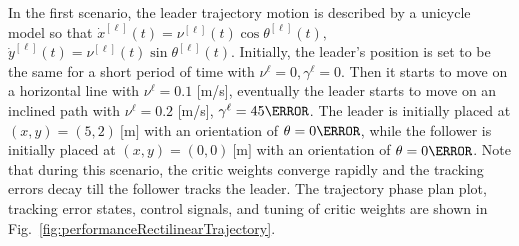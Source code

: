 \documentclass[letterpaper]{article} %
\begin{document}
In the first scenario, the leader trajectory motion is described by a unicycle model so that %
%
$\dot x^{[\ell]}(t) = \nu^{[\ell]}(t)\cos\theta^{[\ell]}(t),$ %
$\dot y^{[\ell]}(t) = \nu^{[\ell]}(t)\sin\theta^{[\ell]}(t).$
%
Initially, the leader's position is set to be the same for a short period of time with $\nu^{\ell} = 0 , \gamma^{\ell} = 0$. Then it starts to move on a horizontal line with $\nu^{\ell} = 0.1 $ [m/s], eventually the leader starts to move on an inclined path with $\nu^{\ell} = 0.2$ [m/s], $\gamma^{\ell} = 45\degree$. The leader is initially placed at $(x,y) = (5, 2)~\si{[\meter]}$ with an orientation of $\theta = 0 \degree $, while the follower  is initially placed at $(x,y) = (0, 0)~\si{[\meter]}$ with an orientation of $\theta = 0\degree$. Note that during this scenario, the critic weights converge rapidly and the tracking errors decay till the follower tracks the leader. The trajectory phase plan plot, tracking error states, control signals, and tuning of critic weights are shown in Fig.~\ref{fig:performanceRectilinearTrajectory}. %
%
\begin{figure*}[htbp]%
    \centering
    \subfigure[][]{%
        \label{fig:trajectoryRectilinearDistance}%
      }
    \subfigure[][]{%
        \label{fig:stateErrorRectilinearDistance}%
      }
    \\
    \subfigure[][]{%
        \label{fig:controlInputsRectilinearDistance}%
      }
    \subfigure[][]{%
        \label{fig:weightRectilinearDistance}%
      }
    \caption[Leader-follower performance for rectilinear trajectory.]{First scenario (rectilinear trajectory): 
         leader-follower trajectories,~ state tracking errors,~ linear speed and steering angle of the follower, and     critic weights.}%
    \label{fig:performanceRectilinearTrajectory}%
\end{figure*}
%
\end{document}
